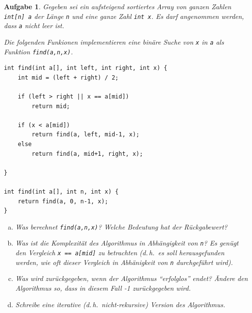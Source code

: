 \documentclass[a4paper,12pt,parskip=full]{scrartcl}
\theoremstyle{exercise}
\newtheorem{exercise}{Aufgabe}
\begin{document}
\begin{exercise}
  Gegeben sei ein aufsteigend sortiertes Array von ganzen Zahlen
  \lstinline|int[n] a| der Länge \lstinline|n| und eine ganze Zahl
  \lstinline|int x|. Es darf angenommen werden, dass \lstinline|a|
  nicht leer ist.

  Die folgenden Funkionen implementieren eine \emph{binäre Suche} von
  \lstinline|x| in \lstinline|a| als Funktion \lstinline|find(a,n,x)|.
  \begin{lstlisting}
int find(int a[], int left, int right, int x) {
    int mid = (left + right) / 2;

    if (left > right || x == a[mid])
        return mid;

    if (x < a[mid])
        return find(a, left, mid-1, x);
    else
        return find(a, mid+1, right, x);

}

int find(int a[], int n, int x) {
    return find(a, 0, n-1, x);
}
\end{lstlisting}
\begin{enumerate}[a)]
\item Was berechnet \lstinline|find(a,n,x)|? Welche Bedeutung hat der Rückgabewert?
\item Was ist die Komplexität des Algorithmus in Abhängigkeit von
  \lstinline|n|? Es genügt den Vergleich \lstinline|x == a[mid]|
  zu betrachten (d.\,h.\ es soll herausgefunden werden, wie oft
  dieser Vergleich in Abhänigkeit von \lstinline|n| durchgeführt wird).
\item Was wird zurückgegeben, wenn der Algorithmus ``erfolglos'' endet?
  Ändere den Algorithmus so, dass in diesem Fall -1 zurückgegeben wird.
\item Schreibe eine iterative (d.\,h.\ nicht-rekursive) Version des
  Algorithmus.
\end{enumerate}
\end{exercise}
\end{document}
